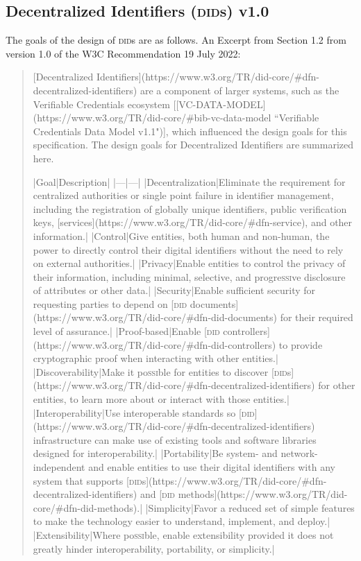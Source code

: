 \documentclass[twoside]{article}
\begin{document}
\subsection{Decentralized Identifiers (\textsc{did}s) v1.0}

The goals of the design of \textsc{did}s are as follows. An Excerpt from Section 1.2 from version 1.0 of the W3C Recommendation 19 July 2022:

\begin{quote}
[Decentralized Identifiers](https://www.w3.org/TR/did-core/#dfn-decentralized-identifiers) are a component of larger systems, such as the Verifiable Credentials ecosystem [[VC-DATA-MODEL](https://www.w3.org/TR/did-core/#bib-vc-data-model ``Verifiable Credentials Data Model v1.1")], which influenced the design goals for this specification. The design goals for Decentralized Identifiers are summarized here.

|Goal|Description|
|---|---|
|Decentralization|Eliminate the requirement for centralized authorities or single point failure in identifier management, including the registration of globally unique identifiers, public verification keys, [services](https://www.w3.org/TR/did-core/#dfn-service), and other information.|
|Control|Give entities, both human and non-human, the power to directly control their digital identifiers without the need to rely on external authorities.|
|Privacy|Enable entities to control the privacy of their information, including minimal, selective, and progre\textsc{ssi}ve disclosure of attributes or other data.|
|Security|Enable sufficient security for requesting parties to depend on [\textsc{did} documents](https://www.w3.org/TR/did-core/#dfn-did-documents) for their required level of assurance.|
|Proof-based|Enable [\textsc{did} controllers](https://www.w3.org/TR/did-core/#dfn-did-controllers) to provide cryptographic proof when interacting with other entities.|
|Discoverability|Make it po\textsc{ssi}ble for entities to discover [\textsc{did}s](https://www.w3.org/TR/did-core/#dfn-decentralized-identifiers) for other entities, to learn more about or interact with those entities.|
|Interoperability|Use interoperable standards so [\textsc{did}](https://www.w3.org/TR/did-core/#dfn-decentralized-identifiers) infrastructure can make use of existing tools and software libraries designed for interoperability.|
|Portability|Be system- and network-independent and enable entities to use their digital identifiers with any system that supports [\textsc{did}s](https://www.w3.org/TR/did-core/#dfn-decentralized-identifiers) and [\textsc{did} methods](https://www.w3.org/TR/did-core/#dfn-did-methods).|
|Simplicity|Favor a reduced set of simple features to make the technology easier to understand, implement, and deploy.|
|Extensibility|Where po\textsc{ssi}ble, enable extensibility provided it does not greatly hinder interoperability, portability, or simplicity.|
\end{quote}

\printbibliography
\end{document}
